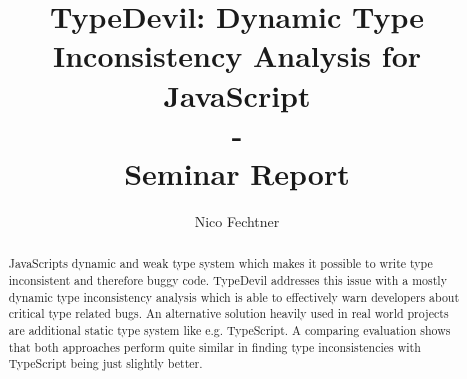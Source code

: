 \documentclass[runningheads,a4paper]{llncs}
\newcommand{\keywords}[1]{\par\addvspace\baselineskip

\noindent\keywordname\enspace\ignorespaces#1}
\begin{document}

\mainmatter  %

\title{TypeDevil: Dynamic Type Inconsistency Analysis for JavaScript\\-\\Seminar Report}


\author{Nico Fechtner}
%


%
%

\toctitle{}
\tocauthor{}
\maketitle

\tableofcontents
\newpage

\begin{abstract}
JavaScripts dynamic and weak type system which makes it possible to write type inconsistent and therefore buggy code. 
TypeDevil addresses this issue with a mostly dynamic type inconsistency analysis which is able to effectively warn developers about critical type related bugs.
An alternative solution heavily used in real world projects are additional static type system like e.g. TypeScript.
A comparing evaluation shows that both approaches perform quite similar in finding type inconsistencies with TypeScript being just slightly better.
\end{abstract}
\end{document}
